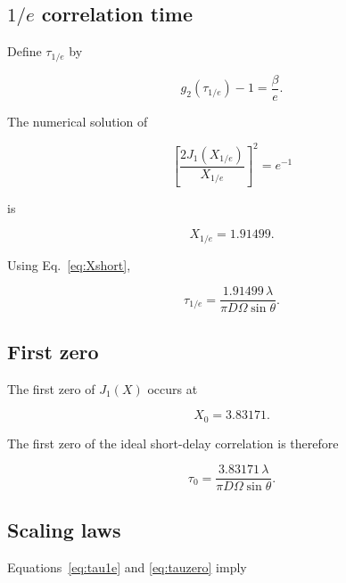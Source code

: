 \documentclass[11pt]{article}
\begin{document}
\subsection{\texorpdfstring{$1/e$}{1/e} correlation time}

Define $\tau_{1/e}$ by

\begin{equation}
    g_2(\tau_{1/e})-1
    =
    \frac{\beta}{e}.
\end{equation}

The numerical solution of

\begin{equation}
    \left[
        \frac{2J_1(X_{1/e})}{X_{1/e}}
    \right]^2
    =
    e^{-1}
\end{equation}

is

\begin{equation}
    X_{1/e}=1.91499.
\end{equation}

Using Eq.~\eqref{eq:Xshort},

\begin{equation}
    \boxed{
    \tau_{1/e}
    =
    \frac{
        1.91499\,\lambda
    }{
        \pi D\Omega\sin\theta
    }
    }.
    \label{eq:tau1e}
\end{equation}

\subsection{First zero}

The first zero of $J_1(X)$ occurs at

\begin{equation}
    X_0=3.83171.
\end{equation}

The first zero of the ideal short-delay correlation is therefore

\begin{equation}
    \boxed{
    \tau_0
    =
    \frac{
        3.83171\,\lambda
    }{
        \pi D\Omega\sin\theta
    }
    }.
    \label{eq:tauzero}
\end{equation}

\subsection{Scaling laws}

Equations~\eqref{eq:tau1e} and \eqref{eq:tauzero} imply
\end{document}
